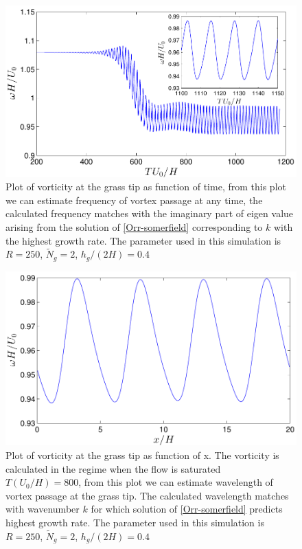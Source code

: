 \documentclass[12pt]{report}   %
\newcommand{\Ndg}{\tilde{N}_g}
\begin{document}
\begin{figure}
\centerline{\includegraphics[scale=0.95]{LinearStabilityVsCFD_TimeVsVorticity}}
\caption{Plot of vorticity at the grass tip as function of time, from this plot we can estimate frequency of vortex passage at any time, the calculated frequency matches with the imaginary part of eigen value arising from the solution of \eqref{Orr-somerfield} corresponding to $k$ with the highest growth rate. The parameter used in this simulation is $R=250$, $\Ndg=2$, $h_g/(2H)=0.4$ }
\label{TimeVsVorticity}
\end{figure}

\begin{figure}
\centerline{\includegraphics[scale=0.95]{LinearStabilityVsCFD_XVsVorticity}}
\caption{Plot of vorticity at the grass tip as function of x. The vorticity is calculated in the regime when the flow is saturated $T(U_0/H)=800$, from this plot we can estimate wavelength of vortex passage at the grass tip. The calculated wavelength  matches with wavenumber $k$ for which solution of \eqref{Orr-somerfield} predicts highest growth rate. The parameter used in this simulation is $R=250$, $\Ndg=2$, $h_g/(2H)=0.4$}
\label{XVsVorticity}
\end{figure}
\end{document}
